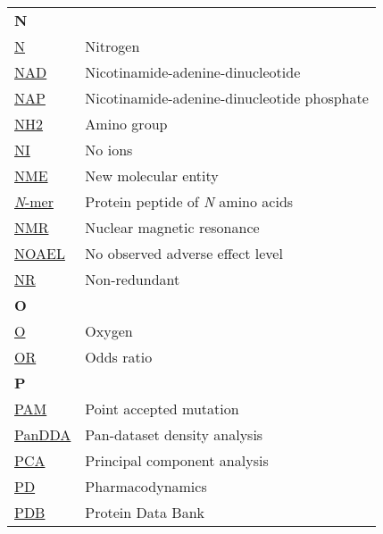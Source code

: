 \begin{longtable}[l]{@{}p{2.5cm}p{12cm}@{}}
\textbf{\large N} & \\[0.25cm]
\textmd{\href{https://en.wikipedia.org/wiki/Nitrogen}{N}} & Nitrogen \\
\textmd{\href{https://www.ebi.ac.uk/pdbe-srv/pdbechem/chemicalCompound/show/NAD}{NAD}} & Nicotinamide-adenine-dinucleotide \\
\textmd{\href{https://www.ebi.ac.uk/pdbe-srv/pdbechem/chemicalCompound/show/NAP}{NAP}} & Nicotinamide-adenine-dinucleotide phosphate \\
\textmd{\href{https://en.wikipedia.org/wiki/Amine}{NH2}} & Amino group \\
\textmd{\href{https://jcheminf.biomedcentral.com/articles/10.1186/s13321-024-00923-z}{NI}} & No ions \\
\textmd{\href{https://en.wikipedia.org/wiki/New_chemical_entity}{NME}} & New molecular entity \\
\textmd{\href{https://en.wikipedia.org/wiki/Peptide}{\textit{N}-mer}} & Protein peptide of \textit{N} amino acids \\
\textmd{\href{https://en.wikipedia.org/wiki/Nuclear_magnetic_resonance_spectroscopy}{NMR}} & Nuclear magnetic resonance \\
\textmd{\href{https://en.wikipedia.org/wiki/No-observed-adverse-effect_level}{NOAEL}} & No observed adverse effect level \\
\textmd{\href{https://jcheminf.biomedcentral.com/articles/10.1186/s13321-024-00923-z}{NR}} & Non-redundant \\[0.3175cm]
\textbf{\large O} & \\[0.25cm]
\textmd{\href{https://en.wikipedia.org/wiki/Oxygen}{O}} & Oxygen \\
\textmd{\href{https://en.wikipedia.org/wiki/Odds_ratio}{OR}} & Odds ratio \\[0.3175cm]
\textbf{\large P} & \\[0.25cm]
\textmd{\href{https://en.wikipedia.org/wiki/Point_accepted_mutation}{PAM}} & Point accepted mutation \\
\textmd{\href{https://www.nature.com/articles/ncomms15123}{PanDDA}} & Pan-dataset density analysis \\
\textmd{\href{https://en.wikipedia.org/wiki/Principal_component_analysis}{PCA}} & Principal component analysis \\
\textmd{\href{https://en.wikipedia.org/wiki/Pharmacodynamics}{PD}} & Pharmacodynamics \\ 
\textmd{\href{https://en.wikipedia.org/wiki/Protein_Data_Bank}{PDB}} & Protein Data Bank \\

\end{longtable}
